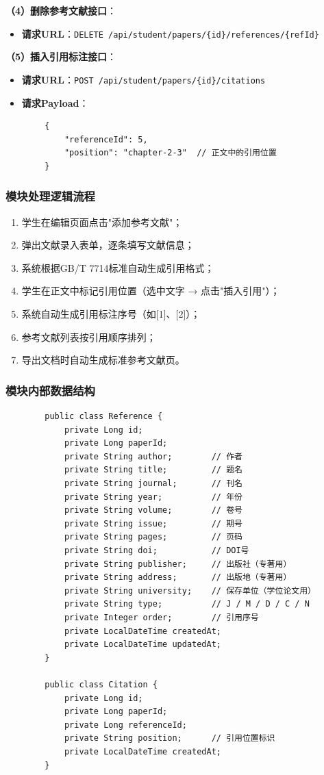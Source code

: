 \documentclass{../template/softeng}
\begin{document}
	\textbf{（4）删除参考文献接口}：
	\begin{itemize}
		\item \textbf{请求URL}：\texttt{DELETE /api/student/papers/\{id\}/references/\{refId\}}
	\end{itemize}

	\textbf{（5）插入引用标注接口}：
	\begin{itemize}
		\item \textbf{请求URL}：\texttt{POST /api/student/papers/\{id\}/citations}
		\item \textbf{请求Payload}：
	\end{itemize}
	\begin{verbatim}
		{
			"referenceId": 5,
			"position": "chapter-2-3"  // 正文中的引用位置
		}
	\end{verbatim}

	\subsubsection{模块处理逻辑流程}
	\begin{enumerate}
		\item 学生在编辑页面点击"添加参考文献"；
		\item 弹出文献录入表单，逐条填写文献信息；
		\item 系统根据GB/T 7714标准自动生成引用格式；
		\item 学生在正文中标记引用位置（选中文字 → 点击"插入引用"）；
		\item 系统自动生成引用标注序号（如[1]、[2]）；
		\item 参考文献列表按引用顺序排列；
		\item 导出文档时自动生成标准参考文献页。
	\end{enumerate}

	\subsubsection{模块内部数据结构}
	\begin{verbatim}
		public class Reference {
			private Long id;
			private Long paperId;
			private String author;        // 作者
			private String title;         // 题名
			private String journal;       // 刊名
			private String year;          // 年份
			private String volume;        // 卷号
			private String issue;         // 期号
			private String pages;         // 页码
			private String doi;           // DOI号
			private String publisher;     // 出版社（专著用）
			private String address;       // 出版地（专著用）
			private String university;    // 保存单位（学位论文用）
			private String type;          // J / M / D / C / N
			private Integer order;        // 引用序号
			private LocalDateTime createdAt;
			private LocalDateTime updatedAt;
		}

		public class Citation {
			private Long id;
			private Long paperId;
			private Long referenceId;
			private String position;      // 引用位置标识
			private LocalDateTime createdAt;
		}
	\end{verbatim}
\end{document}
